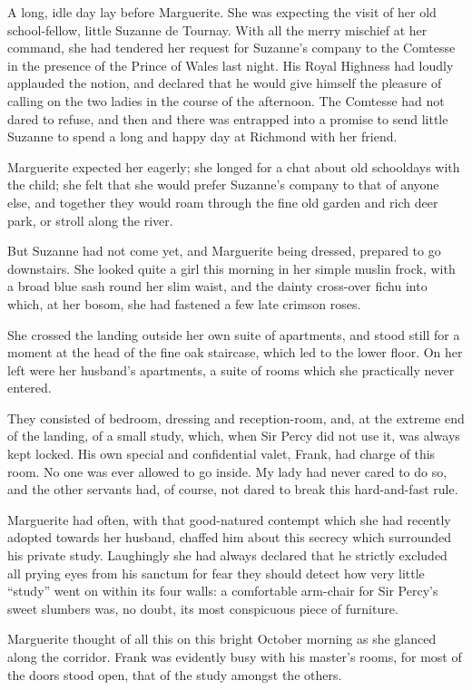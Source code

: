 \documentclass[paper=5.5in:8.5in,BCOR=7mm,twoside,DIV=calc,12pt,usegeometry,chapterprefix,endperiod,headings=big]{scrbook}
\begin{document}
A long, idle day lay before Marguerite. She was expecting the visit of her old school-fellow, little Suzanne de Tournay. With all the merry mischief at her command, she had tendered her request for Suzanne's company to the Comtesse in the presence of the Prince of Wales last night. His Royal Highness had loudly applauded the notion, and declared that he would give himself the pleasure of calling on the two ladies in the course of the afternoon. The Comtesse had not dared to refuse, and then and there was entrapped into a promise to send little Suzanne to spend a long and happy day at Richmond with her friend.

Marguerite expected her eagerly; she longed for a chat about old schooldays with the child; she felt that she would prefer Suzanne's company to that of anyone else, and together they would roam through the fine old garden and rich deer park, or stroll along the river.

But Suzanne had not come yet, and Marguerite being dressed, prepared to go downstairs. She looked quite a girl this morning in her simple muslin frock, with a broad blue sash round her slim waist, and the dainty cross-over fichu into which, at her bosom, she had fastened a few late crimson roses.

She crossed the landing outside her own suite of apartments, and stood still for a moment at the head of the fine oak staircase, which led to the lower floor. On her left were her husband's apartments, a suite of rooms which she practically never entered.

They consisted of bedroom, dressing and reception-room, and, at the extreme end of the landing, of a small study, which, when Sir Percy did not use it, was always kept locked. His own special and confidential valet, Frank, had charge of this room. No one was ever allowed to go inside. My lady had never cared to do so, and the other servants had, of course, not dared to break this hard-and-fast rule.

Marguerite had often, with that good-natured contempt which she had recently adopted towards her husband, chaffed him about this secrecy which surrounded his private study. Laughingly she had always declared that he strictly excluded all prying eyes from his sanctum for fear they should detect how very little \enquote{study} went on within its four walls: a comfortable arm-chair for Sir Percy's sweet slumbers was, no doubt, its most conspicuous piece of furniture.

Marguerite thought of all this on this bright October morning as she glanced along the corridor. Frank was evidently busy with his master's rooms, for most of the doors stood open, that of the study amongst the others.
\end{document}
